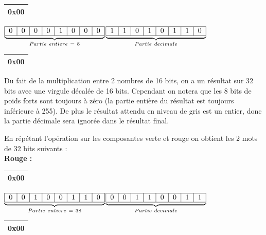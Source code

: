 \begin{center}
\begin{tabular}{|c||}
    \hline
    \textbf{0x00}\\
    \hline
    \end{tabular}$\underbrace{
    \begin{tabular}{|c|c|c|c|c|c|c|c|}
    \hline
    0 & 0 & 0 & 0 & 1 & 0 & 0 & 0 \\
    \hline
    \end{tabular}}_{Partie\ entiere\ =\ 8}$$\underbrace{
    \begin{tabular}{|c|c|c|c|c|c|c|c|}
    \hline
    1 & 1 & 0 & 1 & 0 & 1 & 1 & 0 \\
    \hline
    \end{tabular}}_{Partie\ decimale}$\begin{tabular}{||c|}
    \hline
    \textbf{0x00} \\
    \hline
    \end{tabular} 
\end{center}

Du fait de la multiplication entre 2 nombres de 16 bits, on a un résultat sur 32 bits avec une virgule décalée de 16 bits. Cependant on notera que les 8 bits de poids forts sont toujours à zéro (la partie entière du résultat est toujours inférieure à 255). De plus le résultat attendu en niveau de gris est un entier, donc la partie décimale sera ignorée dans le résultat final.

En répétant l'opération sur les composantes verte et rouge on obtient les 2 mots de 32 bits suivants :\\
\textbf{Rouge :}
\begin{center}
\begin{tabular}{|c||}
    \hline
    \textbf{0x00}\\
    \hline
    \end{tabular}$\underbrace{
    \begin{tabular}{|c|c|c|c|c|c|c|c|}
    \hline
    0 & 0 & 1 & 0 & 0 & 1 & 1 & 0 \\
    \hline
    \end{tabular}}_{Partie\ entiere\ =\ 38}$$\underbrace{
    \begin{tabular}{|c|c|c|c|c|c|c|c|}
    \hline
    0 & 0 & 1 & 1 & 0 & 0 & 1 & 1 \\
    \hline
    \end{tabular}}_{Partie\ decimale}$\begin{tabular}{||c|}
    \hline
    \textbf{0x00} \\
    \hline
    \end{tabular} 
\end{center}

